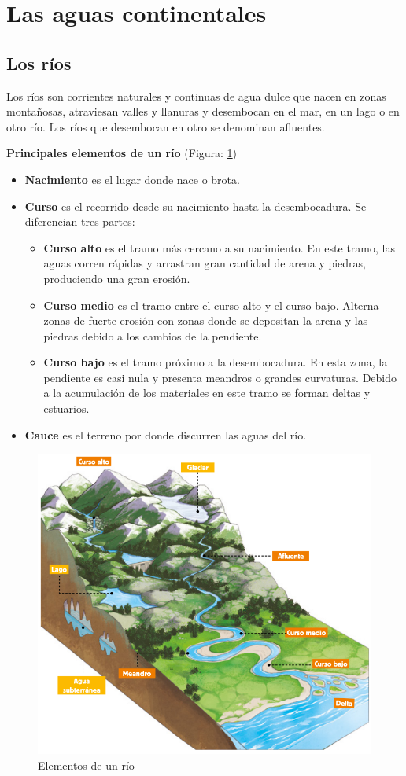 \section{Las aguas continentales}

\subsection{Los ríos}

Los ríos son corrientes naturales y continuas de agua dulce que nacen en zonas montañosas, atraviesan valles y llanuras y desembocan en el mar, en un lago o en otro río. Los ríos que desembocan en otro se denominan afluentes.

\vspace{3mm}
\textbf{Principales elementos de un río} (Figura: \ref{fig:elementos-rio})
\begin{itemize}
    \item \textbf{Nacimiento} es el lugar donde nace o brota.
    \item \textbf{Curso} es el recorrido desde su nacimiento hasta la desembocadura. Se diferencian tres partes:
    \begin{itemize}
        \item \textbf{Curso alto} es el tramo más cercano a su nacimiento. En este tramo, las aguas corren rápidas y arrastran gran cantidad de arena y piedras, produciendo una gran erosión.
        \item \textbf{Curso medio} es el tramo entre el curso alto y el curso bajo. Alterna zonas de fuerte erosión con zonas donde se depositan la arena y las piedras debido a los cambios de la pendiente.
        \item \textbf{Curso bajo} es el tramo próximo a la desembocadura. En esta zona, la pendiente es casi nula y presenta meandros o grandes curvaturas. Debido a la acumulación de los materiales en este tramo se forman deltas y estuarios.
    \end{itemize}
    \item \textbf{Cauce} es el terreno por donde discurren las aguas del río.
\end{itemize}

\begin{figure}[!ht]
    \centering
    \includegraphics[width=0.7\linewidth]{Tema2/07_Aguas_continentales.png}
    \caption{Elementos de un río}
    \label{fig:elementos-rio}
\end{figure}

